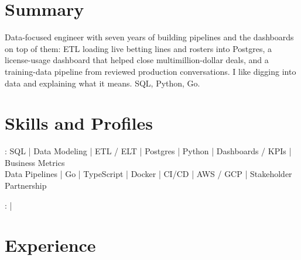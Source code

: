 \documentclass[print]{jack-resume}
\begin{document}
\pagecolor{darkmodeBackground}


\begin{minipage}[t][1cm][t]{.03\textwidth}
    \hfill
\end{minipage}

\section{Summary}
Data-focused engineer with seven years of building pipelines and the dashboards on top of them: ETL loading live betting lines and rosters into Postgres, a license-usage dashboard that helped close multimillion-dollar deals, and a training-data pipeline from reviewed production conversations. I like digging into data and explaining what it means. SQL, Python, Go.
\sectionsep

\section{Skills and Profiles}
:
SQL \hfill | \hfill
Data Modeling \hfill | \hfill
ETL / ELT \hfill | \hfill
Postgres \hfill | \hfill
Python \hfill | \hfill
Dashboards / KPIs \hfill | \hfill
Business Metrics \\
\hspace{1.0cm} Data Pipelines \hfill | \hfill
Go \hfill | \hfill
TypeScript \hfill | \hfill
Docker \hfill | \hfill
CI/CD \hfill | \hfill
AWS / GCP \hfill | \hfill
Stakeholder Partnership \\

\raggedright{
    :
      \href{https://www.linkedin.com/in/jack-sturtevant/}{ \ExternalLink} |
     \href{https://github.com/jacksturt}{ \ExternalLink}}

\section{Experience}
\end{document}
